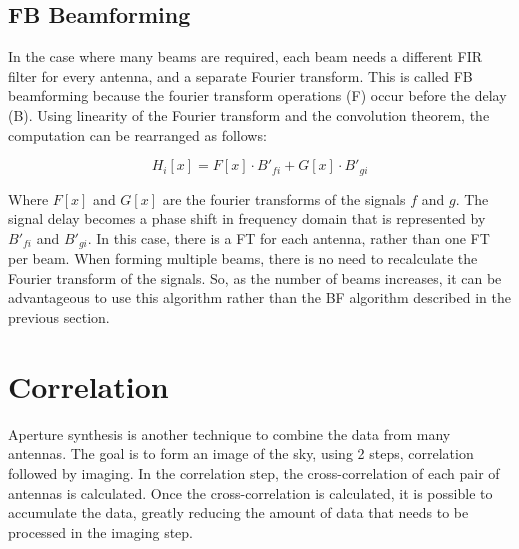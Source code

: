 
\subsection{FB Beamforming}
In the case where many beams are required, each beam needs a different FIR filter for every antenna, and a separate Fourier transform. 
This is called FB beamforming because the fourier transform operations (F) occur before the delay (B). 
Using linearity of the Fourier transform and the convolution theorem, the computation can be rearranged as follows:

\[H_i[x] = F[x] \cdot B'_{fi} + G[x] \cdot B'_{gi}\]

Where $F[x]$ and $G[x]$ are the fourier transforms of the signals $f$ and $g$.
The signal delay becomes a phase shift in frequency domain that is represented by $B'_{fi}$ and $B'_{gi}$. 
In this case, there is a FT for each antenna, rather than one FT per beam. 
When forming multiple beams, there is no need to recalculate the Fourier transform of the signals. 
So, as the number of beams increases, it can be advantageous to use this algorithm rather than the BF algorithm described in the previous section. 





\section{Correlation}
\label{Real Time Radio Astronomy Algorithms:Correlation}
Aperture synthesis is another technique to combine the data from many antennas.
The goal is to form an image of the sky, using 2 steps, correlation followed by imaging.
In the correlation step, the cross-correlation of each pair of antennas is calculated. 
Once the cross-correlation is calculated, it is possible to accumulate the data, greatly reducing the amount of data that needs to be processed in the imaging step.

